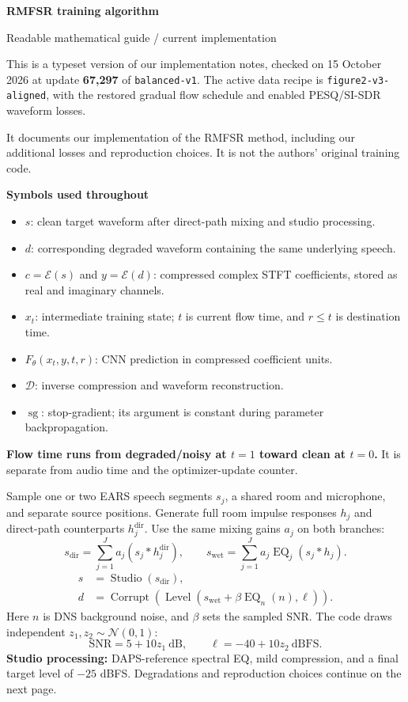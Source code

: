 \documentclass[11pt,letterpaper]{article}
\newcommand{\heading}[2]{\vspace{5pt}{\Large\sffamily\bfseries\color{accent}#1\quad #2}\par\vspace{4pt}}
\newcommand{\subheading}[1]{{\sffamily\bfseries\color{ink}#1}\par}
\newcommand{\E}{\mathcal E}\newcommand{\D}{\mathcal D}
\newcommand{\sg}{\operatorname{sg}}
\newcommand{\note}[1]{\par\smallskip{\color{accent}\vrule width 2pt}\hspace{7pt}\begin{minipage}{0.94\linewidth}\small #1\end{minipage}\par\smallskip}
\begin{document}
\thispagestyle{plain}
{\sffamily\bfseries\fontsize{28}{32}\selectfont\color{ink}RMFSR training algorithm}\par
{\sffamily\color{muted}Readable mathematical guide / current implementation}\par

This is a typeset version of our implementation notes, checked on 15 October 2026 at update \textbf{67,297} of \texttt{balanced-v1}. The active data recipe is \texttt{figure2-v3-aligned}, with the restored gradual flow schedule and enabled PESQ/SI-SDR waveform losses.

It documents our implementation of the RMFSR method, including our additional losses and reproduction choices. It is not the authors' original training code.

\subheading{Symbols used throughout}
\begin{itemize}
\item $s$: clean target waveform after direct-path mixing and studio processing.
\item $d$: corresponding degraded waveform containing the same underlying speech.
\item $c=\E(s)$ and $y=\E(d)$: compressed complex STFT coefficients, stored as real and imaginary channels.
\item $x_t$: intermediate training state; $t$ is current flow time, and $r\leq t$ is destination time.
\item $F_\theta(x_t,y,t,r)$: CNN prediction in compressed coefficient units.
\item $\D$: inverse compression and waveform reconstruction.
\item $\sg$: stop-gradient; its argument is constant during parameter backpropagation.
\end{itemize}
\note{\textbf{Flow time runs from degraded/noisy at $t=1$ toward clean at $t=0$.} It is separate from audio time and the optimizer-update counter.}

\heading{1}{Generate a paired training example}
Sample one or two EARS speech segments $s_j$, a shared room and microphone, and separate source positions. Generate full room impulse responses $h_j$ and direct-path counterparts $h_j^{\mathrm{dir}}$. Use the same mixing gains $a_j$ on both branches:
\[
 s_{\mathrm{dir}}=\sum_{j=1}^{J}a_j(s_j*h_j^{\mathrm{dir}}),\qquad
 s_{\mathrm{wet}}=\sum_{j=1}^{J}a_j\operatorname{EQ}_j(s_j*h_j).
\]
\begin{align*}
 s&=\operatorname{Studio}(s_{\mathrm{dir}}),\\
 d&=\operatorname{Corrupt}\!\left(\operatorname{Level}
       (s_{\mathrm{wet}}+\beta\operatorname{EQ}_n(n),\ell)\right).
\end{align*}
Here $n$ is DNS background noise, and $\beta$ sets the sampled SNR. The code draws independent $z_1,z_2\sim\mathcal N(0,1)$:
\[
 \mathrm{SNR}=5+10z_1\ \mathrm{dB},\qquad \ell=-40+10z_2\ \mathrm{dBFS}.
\]
\textbf{Studio processing:} DAPS-reference spectral EQ, mild compression, and a final target level of $-25$ dBFS. Degradations and reproduction choices continue on the next page.
\end{document}
